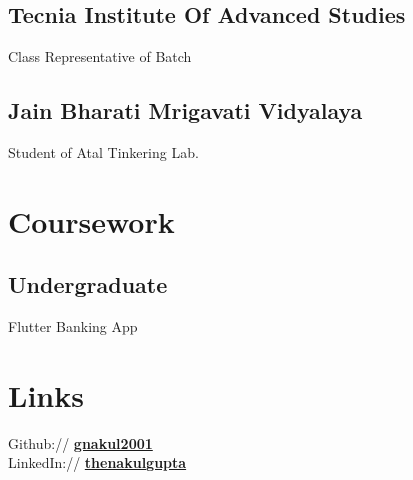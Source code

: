 \documentclass[]{deedy-resume-openfont}
\begin{document}
\begin{minipage}[t]{0.4\textwidth}
\subsection{Tecnia Institute Of Advanced Studies}
Class Representative of Batch
\sectionsep

\subsection{Jain Bharati Mrigavati Vidyalaya}
Student of Atal Tinkering Lab.
\sectionsep



\section{Coursework}

\subsection{Undergraduate}
Flutter Banking App\\

\vspace{\topsep} %
\section{Links} 
Github:// \href{https://github.com/gnakul2001}{\bf gnakul2001} \\
LinkedIn://  \href{https://www.linkedin.com/in/thenakulgupta}{\bf thenakulgupta} \\
\sectionsep

%
%

\end{minipage} 
\hfill
\end{document}
